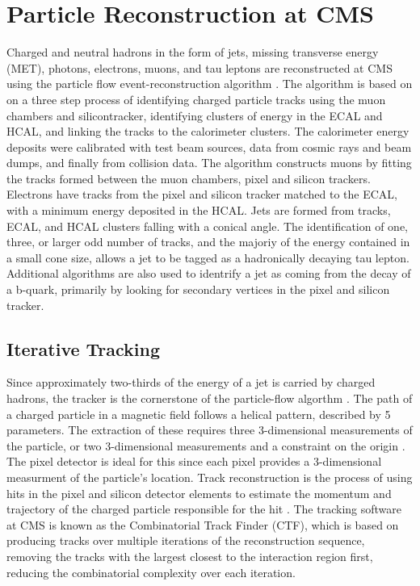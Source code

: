 \chapter{Particle Reconstruction at CMS}
\label{reconstruction_overview}

\par Charged and neutral hadrons in the form of jets, missing
transverse energy (MET), photons, electrons, muons, and tau leptons
are reconstructed at CMS using the particle flow event-reconstruction
algorithm \cite{CMS-PAS-PFT-09-001}.  The algorithm is based on on a
three step process of identifying charged particle tracks using the
muon chambers and silicontracker, identifying clusters of energy in
the ECAL and HCAL, and linking the tracks to the calorimeter
clusters.  The calorimeter energy deposits were calibrated with test
beam sources, data from cosmic rays and beam dumps, and finally from
collision data.  The algorithm constructs muons by fitting the tracks
formed between the muon chambers, pixel and silicon trackers.
Electrons have tracks from the pixel and silicon tracker matched to
the ECAL, with a minimum energy deposited in the HCAL.  Jets are
formed from tracks, ECAL, and HCAL clusters falling with a conical
angle.  The identification of one, three, or larger odd number of
tracks, and the majoriy of the energy contained in a small cone size,
allows a jet to be tagged as a hadronically decaying tau lepton.
Additional algorithms are also used to identrify a jet as coming from
the decay of a b-quark, primarily by looking for secondary vertices in
the pixel and silicon tracker.  


\section{Iterative Tracking}
\label{iterative_tracking_overview}

\par Since approximately two-thirds of the energy of a jet is carried by
charged hadrons, the tracker is the cornerstone of the particle-flow
algorthm \cite{CMS-PAS-PFT-09-001}.  The path of a charged particle in
a magnetic field follows a helical pattern, described by 5 parameters.
The extraction of these requires three 3-dimensional measurements of
the particle, or two 3-dimensional measurements and a constraint on
the origin \cite{Chatrchyan:2014fea}.  The pixel detector is ideal for
this since each pixel provides a 3-dimensional measurment of the
particle's location.  Track reconstruction is the process of using
hits in the pixel and silicon detector elements to estimate the
momentum and trajectory of the charged particle  responsible for the
hit \cite{Chatrchyan:2014fea}.  The tracking software at CMS is known
as the Combinatorial Track Finder (CTF), which is based on producing
tracks over multiple iterations of the reconstruction sequence,
removing the tracks with the largest \PT closest to the interaction
region first, reducing the combinatorial complexity over each
iteration.   

